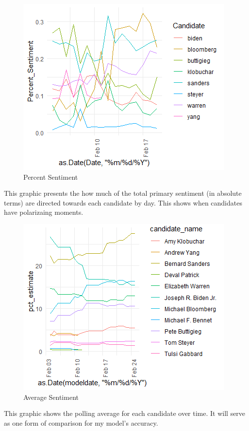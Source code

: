 \documentclass{article}
\begin{document}
\begin{figure}[h!]
    \centering
    \includegraphics[width=.4\linewidth]{Percent_Sentiment.png}
    \caption{Percent Sentiment}
\end{figure}

This graphic presents the how much of the total primary sentiment (in absolute terms) are directed towards each candidate by day. This shows when candidates have polarizaing moments.

\begin{figure}[h!]
    \centering
    \includegraphics[width=.4\linewidth]{Polling_Average.png}
    \caption{Average Sentiment}
\end{figure}

This graphic shows the polling average for each candidate over time. It will serve as one form of comparison for my model's accuracy.
\end{document}
